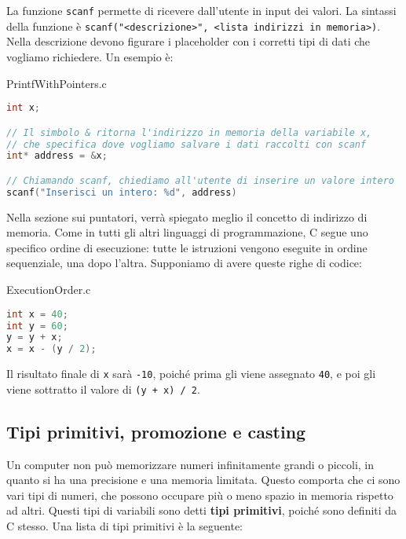 La funzione \verb|scanf| permette di ricevere dall'utente in input dei valori. La sintassi della funzione è \verb|scanf("<descrizione>", <lista indirizzi in memoria>)|. Nella descrizione devono figurare i placeholder con i corretti tipi di dati che vogliamo richiedere. Un esempio è:

\begin{codeblock}{PrintfWithPointers.c}
    \begin{lstlisting}[language = c]
int x;

// Il simbolo & ritorna l'indirizzo in memoria della variabile x,
// che specifica dove vogliamo salvare i dati raccolti con scanf
int* address = &x;

// Chiamando scanf, chiediamo all'utente di inserire un valore intero
scanf("Inserisci un intero: %d", address)
    \end{lstlisting}
\end{codeblock}

Nella sezione sui puntatori, verrà spiegato meglio il concetto di indirizzo di memoria.
\nl
Come in tutti gli altri linguaggi di programmazione, C segue uno specifico ordine di esecuzione: tutte le istruzioni vengono eseguite in ordine sequenziale, una dopo l'altra. Supponiamo di avere queste righe di codice:

\begin{codeblock}{ExecutionOrder.c}
    \begin{lstlisting}[language = c]
int x = 40;
int y = 60;
y = y + x;
x = x - (y / 2);
    \end{lstlisting}
\end{codeblock}

Il risultato finale di \verb|x| sarà \verb|-10|, poiché prima gli viene assegnato \verb|40|, e poi gli viene sottratto il valore di \verb|(y + x) / 2|.

\subsection{Tipi primitivi, promozione e casting}

Un computer non può memorizzare numeri infinitamente grandi o piccoli, in quanto si ha una precisione e una memoria limitata. Questo comporta che ci sono vari tipi di numeri, che possono occupare più o meno spazio in memoria rispetto ad altri. Questi tipi di variabili sono detti \textbf{tipi primitivi}, poiché sono definiti da C stesso. Una lista di tipi primitivi è la seguente:

